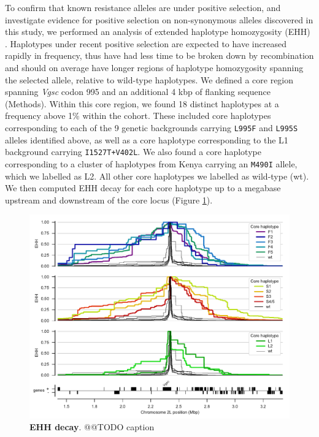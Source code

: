 \documentclass[a4paper,11pt,abstracton,hidelinks]{scrartcl}
\begin{document}
%
To confirm that known resistance alleles are under positive selection, and investigate evidence for positive selection on non-synonymous alleles discovered in this study, we performed an analysis of extended haplotype homozygosity (EHH) \cite{Sabeti2002}.
%
Haplotypes under recent positive selection are expected to have increased rapidly in frequency, thus have had less time to be broken down by recombination and should on average have longer regions of haplotype homozygosity spanning the selected allele, relative to wild-type haplotypes.
%
We defined a core region spanning \textit{Vgsc} codon 995 and an additional 4 kbp of flanking sequence (Methods).
%
Within this core region, we found 18 distinct haplotypes at a frequency above 1\% within the cohort.
%
These included core haplotypes corresponding to each of the 9 genetic backgrounds carrying \texttt{L995F} and \texttt{L995S} alleles identified above, as well as a core haplotype corresponding to the L1 background carrying \texttt{I1527T+V402L}.
%
We also found a core haplotype corresponding to a cluster of haplotypes from Kenya carrying an \texttt{M490I} allele, which we labelled as L2.
%
All other core haplotypes we labelled as wild-type (wt).
%
We then computed EHH decay for each core haplotype up to a megabase upstream and downstream of the core locus (Figure \ref{fig:ehh_decay}).
%


%
\begin{figure}[!t]
  \includegraphics[width=1.1\linewidth,center]{artwork/ehh_decay.pdf}
  \caption{\textbf{EHH decay}. @@TODO caption}
  \label{fig:ehh_decay}
\end{figure}
\end{document}
